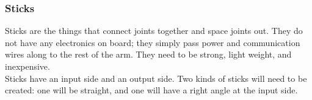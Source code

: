 \subsubsection{Sticks}

Sticks are the things that connect joints together and space joints out. They do not have any electronics on board; they simply pass power and communication wires along to the rest of the arm. They need to be strong, light weight, and inexpensive.\\
\newline
Sticks have an input side and an output side. Two kinds of sticks will need to be created: one will be straight, and one will have a right angle at the input side.

\pagebreak



\FPeval{\runCount}{\startNum}

